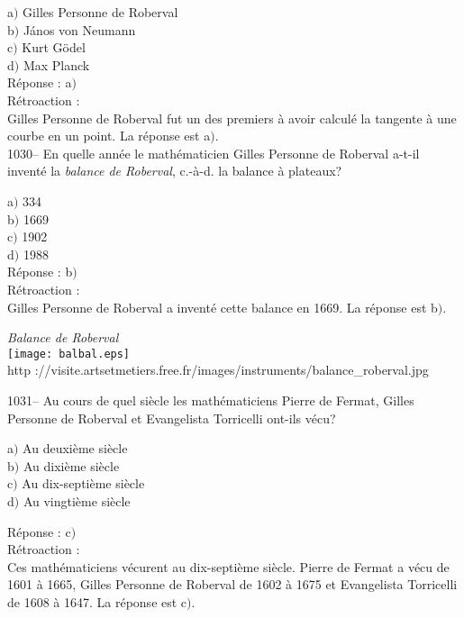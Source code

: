 ﻿\documentclass[letterpaper, 12pt]{article}
\begin{document}
a$)$ Gilles Personne de Roberval  \\
b$)$ J\'anos von Neumann  \\
c$)$ Kurt G\"odel \\
d$)$ Max Planck\\

R\'eponse : a$)$\\

R\'etroaction :\\
Gilles Personne de Roberval fut un des premiers \`a avoir calcul\'e
la tangente \`a une courbe en un point.
La r\'eponse est a$)$.\\

1030-- En quelle ann\'ee le math\'ematicien Gilles Personne de
Roberval a-t-il invent\'e la {\sl balance de Roberval}, c.-\`a-d. la
balance \`a plateaux?

a$)$ 334  \\
b$)$ 1669 \\
c$)$ 1902  \\
d$)$ 1988 \\

R\'eponse : b$)$\\

R\'etroaction :\\
Gilles Personne de Roberval a invent\'e cette balance en 1669. La r\'eponse
est b$)$.\\

        \begin{center}
        {\sl Balance de Roberval}\\
    \texttt{[image: balbal.eps]}\\
        {\footnotesize http
://visite.artsetmetiers.free.fr/images/instruments/balance\_roberval.jpg}
    \end{center}

1031-- Au cours de quel si\`ecle les math\'ematiciens Pierre de
Fermat, Gilles Personne de Roberval et Evangelista Torricelli
ont-ils v\'ecu?

a$)$ Au deuxi\`eme si\`ecle \\
b$)$ Au dixi\`eme si\`ecle \\
c$)$ Au dix-septi\`eme si\`ecle \\
d$)$ Au vingti\`eme si\`ecle

R\'eponse : c$)$\\

R\'etroaction : \\
Ces math\'ematiciens v\'ecurent au dix-septi\`eme si\`ecle. Pierre
de Fermat a v\'ecu de 1601 \`a 1665,
Gilles Personne de Roberval de 1602 \`a 1675 et Evangelista Torricelli de
1608 \`a 1647. La r\'eponse est c$)$.\\
\end{document}
